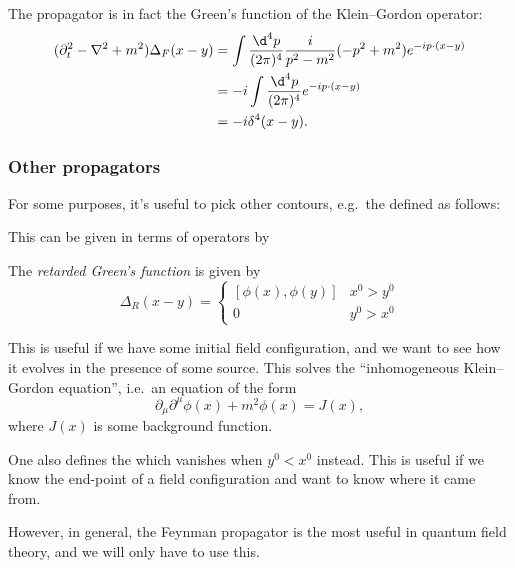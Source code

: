 \documentclass[a4paper]{article}
\begin{document}
The propagator is in fact the Green's function of the Klein--Gordon operator:
\begin{align*}
  (\partial_t^2 - \nabla^2 + m^2) \Delta_F(x - y) &= \int \frac{\d^4 p}{(2\pi)^4} \frac{i}{p^2 - m^2}(-p^2 + m^2) e^{-ip\cdot(x - y)}\\
  &= -i \int \frac{\d^4 p}{(2\pi)^4} e^{-ip\cdot(x - y)}\\
  &= -i \delta^4(x - y).
\end{align*}

\subsubsection*{Other propagators}
For some purposes, it's useful to pick other contours, e.g.\ the  defined as follows:
\begin{center}
\end{center}
This can be given in terms of operators by
\begin{defi}
  The \emph{retarded Green's function} is given by
  \[
    \Delta_R(x - y) =
    \begin{cases}
      [\phi(x), \phi(y)]& x^0 > y^0\\
      0 & y^0 > x^0
    \end{cases}
  \]
\end{defi}
This is useful if we have some initial field configuration, and we want to see how it evolves in the presence of some source. This solves the ``inhomogeneous Klein--Gordon equation'', i.e.\ an equation of the form
\[
  \partial_\mu \partial^\mu \phi(x) + m^2 \phi(x) = J(x),
\]
where $J(x)$ is some background function.

One also defines the  which vanishes when $y^0 < x^0$ instead. This is useful if we know the end-point of a field configuration and want to know where it came from.

However, in general, the Feynman propagator is the most useful in quantum field theory, and we will only have to use this.
\end{document}
